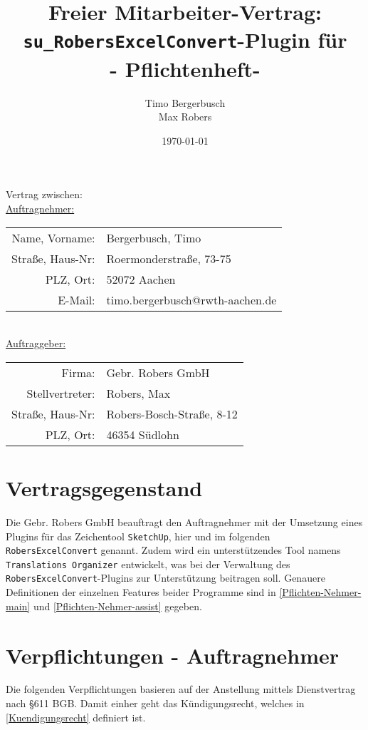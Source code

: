 \documentclass[a4paper,12pt]{article}
\title{Freier Mitarbeiter-Vertrag: \texttt{su\_RobersExcelConvert}-Plugin für \sketchup\\ - Pflichtenheft-}
\date{\germanDate\today}
\author{Timo Bergerbusch\\ Max Robers}
\newcommand{\robersexcelconvert}{\texttt{RobersExcelConvert}\xspace}
\newcommand{\assisttool}{\texttt{Translations Organizer}}
\newcommand{\sketchup}{\texttt{SketchUp}\xspace}
\newcommand{\geberName}{Gebr. Robers GmbH\xspace}
\begin{document}
	\maketitle	
	\begin{center}
		Vertrag zwischen:\\
		\vspace{1cm}
		\underline{Auftragnehmer:}\\
		\begin{tabular}{r l}
			Name, Vorname: & Bergerbusch, Timo \\
			Straße, Haus-Nr: & Roermonderstraße, 73-75 \\
			PLZ, Ort: & 52072 Aachen \\
			E-Mail: & timo.bergerbusch@rwth-aachen.de
		\end{tabular}\\
		\vspace{1cm}
		\underline{Auftraggeber:}\\
		\begin{tabular}{r l}
			Firma: & \geberName\\
			Stellvertreter: &  Robers, Max \\
			Straße, Haus-Nr: &  Robers-Bosch-Straße, 8-12\\
			PLZ, Ort: & 46354 Südlohn
		\end{tabular}
	\end{center}

	
	\newpage
	\section{Vertragsgegenstand}
		Die \geberName beauftragt den Auftragnehmer mit der Umsetzung eines Plugins für das Zeichentool \sketchup, hier und im folgenden \glqq\robersexcelconvert\grqq\xspace genannt. Zudem wird ein unterstützendes Tool namens \glqq\assisttool\grqq\xspace entwickelt, was bei der Verwaltung des \robersexcelconvert-Plugins zur Unterstützung beitragen soll. Genauere Definitionen der einzelnen Features beider Programme sind in \ref{Pflichten-Nehmer-main} und \ref{Pflichten-Nehmer-assist} gegeben.

	\section{Verpflichtungen - Auftragnehmer} \label{Pflichten-Nehmer}
		Die folgenden Verpflichtungen basieren auf der Anstellung mittels Dienstvertrag nach §611 BGB. Damit einher geht das Kündigungsrecht, welches in \ref{Kuendigungsrecht} definiert ist.
\end{document}
